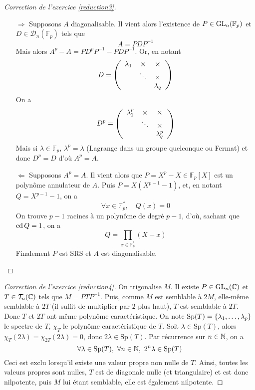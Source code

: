 \begin{proof}[Correction de l'exercice \ref{reduction3}]
	\begin{itemize}
		\item[$\boxed{\Rightarrow}$] Supposons $A$ diagonalisable. Il vient alors l'existence de $P\in \operatorname{GL}_n(\mathbb F_p)$ et $D\in \mathcal D_n(\mathbb F_p)$ tels que \[A=PDP^{-1}\]
		Mais alors $A^p-A=PD^pP^{-1}-PDP^{-1}$. Or, en notant 
		\[
		D = \left(\begin{array}{c c c}
			\lambda_1 & \times &\times \\
			& \ddots & \times\\
			& & \lambda_q
		\end{array}\right)
		\]
		On a \[
		D^p=\left(\begin{array}{c c c}
			\lambda_1^p & \times&\times\\
			& \ddots & \times\\
			& & \lambda_q^p
		\end{array}\right)
		\]
		Mais si $\lambda\in\mathbb F_p$, $\lambda^p=\lambda$ (Lagrange dans un groupe quelconque ou Fermat) et donc $D^p=D$ d'où $A^p=A$.
		\item[$\boxed{\Leftarrow}$] Supposons $A^p=A$. Il vient alors que $P=X^p-X\in\mathbb F_p[X]$ est un polynôme annulateur de $A$. 
        Puis $P = X(X^{p-1}-1)$, et, en notant $Q=X^{p-1}-1$, on a \[\forall x\in\mathbb F_p^*,\quad Q(x)=0\]
		On trouve $p-1$ racines à un polynôme de degré $p-1$, d'où, sachant que $\operatorname{cd} Q=1$, on a \[Q=\prod_{x\in\mathbb F_p^*}(X-x)\]
		Finalement $P$ est SRS et $A$ est diagonalisable.

	\end{itemize}
\end{proof}

\begin{proof}[Correction de l'exercice \ref{reduction4}]
	On trigonalise $M$. Il existe $P\in \operatorname{GL}_n(\operatorname{\mathbb C})$ et $T\in \mathcal T_n(\operatorname{\mathbb C})$ tels que $M=PTP^{-1}$. 
    Puis, comme $M$ est semblable à $2M$, elle-même semblable à $2T$ (il suffit de multiplier par $2$ plus haut), $T$ est semblable à $2T$. 
    Donc $T$ et $2T$ ont même polynôme caractéristique. On note $\operatorname{Sp}(T)=\lbrace \lambda_1,\dots,\lambda_p\rbrace$ le spectre de $T$, $\chi_T$ 
    le polynôme caractéristique de $T$. Soit $\lambda\in \text{Sp}(T)$, alors $\chi_T(2\lambda)=\chi_{2T}(2\lambda)=0$, donc $2\lambda \in \text{Sp}(T)$. 
    Par récurrence sur $n\in\operatorname{\mathbb N}$, on a \[\forall \lambda \in \text{Sp}(T),\ \forall n\in\operatorname{\mathbb N},\ 2^n\lambda\in\text{Sp}(T)\]
	Ceci est exclu lorsqu'il existe une valeur propre non nulle de $T$. 
    Ainsi, toutes les valeurs propres sont nulles, $T$ est de diagonale nulle (et triangulaire) et est donc nilpotente, puis $M$ lui étant semblable, 
    elle est également nilpotente.
\end{proof}

